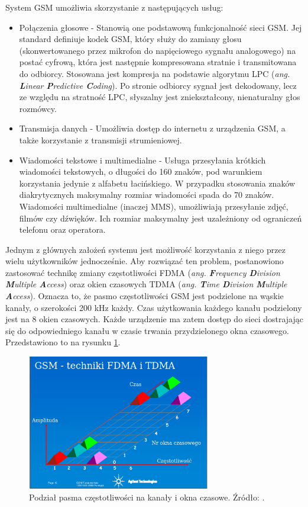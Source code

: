 System GSM umożliwia skorzystanie z następujących usług:
\begin{itemize}
	\item Połączenia głosowe - Stanowią one podstawową funkcjonalność sieci GSM. Jej standard definiuje kodek GSM, który służy do zamiany głosu (skonwertowanego przez mikrofon do napięciowego sygnału analogowego) na postać cyfrową, która jest następnie kompresowana stratnie i transmitowana do odbiorcy. Stosowana jest kompresja na podstawie algorytmu LPC (\textit{ang. \textbf{L}inear \textbf{P}redictive \textbf{C}oding}). Po stronie odbiorcy sygnał jest dekodowany, lecz ze względu na stratność LPC, słyszalny jest zniekształcony, nienaturalny głos rozmówcy.
	\item Transmisja danych - Umożliwia dostęp do internetu z urządzenia GSM, a także korzystanie z transmisji strumieniowej.
	\pagebreak
	\item Wiadomości tekstowe i multimedialne - Usługa przesyłania krótkich wiadomości tekstowych, o długości do 160 znaków, pod warunkiem korzystania jedynie z alfabetu łacińskiego. W przypadku stosowania znaków diakrytycznych maksymalny rozmiar wiadomości spada do 70 znaków. Wiadomości multimedialne (inaczej MMS), umożliwiają przesyłanie zdjęć, filmów czy dźwięków. Ich rozmiar maksymalny jest uzależniony od ograniczeń telefonu oraz operatora.
\end{itemize}

Jednym z głównych założeń systemu jest możliwość korzystania z niego przez wielu użytkowników jednocześnie. Aby rozwiązać ten problem, postanowiono zastosować technikę zmiany częstotliwości FDMA (\textit{ang. \textbf{F}requency \textbf{D}ivision \textbf{M}ultiple \textbf{A}ccess}) oraz okien czasowych TDMA (\textit{ang. \textbf{T}ime \textbf{D}ivision \textbf{M}ultiple \textbf{A}ccess}). Oznacza to, że pasmo częstotliwości GSM jest podzielone na wąskie kanały, o szerokości 200 kHz każdy. Czas użytkowania każdego kanału podzielony jest na 8 okien czasowych. Każde urządzenie ma zatem dostęp do sieci dostrajając się do odpowiedniego kanału w czasie trwania przydzielonego okna czasowego. Przedstawiono to na rysunku \ref{fig:image_gsm_frequencies_timeslots}.

\begin{figure}[H]
	\centering
	\includegraphics[width=8cm]{img/theory/GSM/gsm_timeslots_frequencies.png}
	\caption{Podział pasma częstotliwości na kanały i okna czasowe. Źródło: \cite{GSM}.}
	\label{fig:image_gsm_frequencies_timeslots}
\end{figure}


